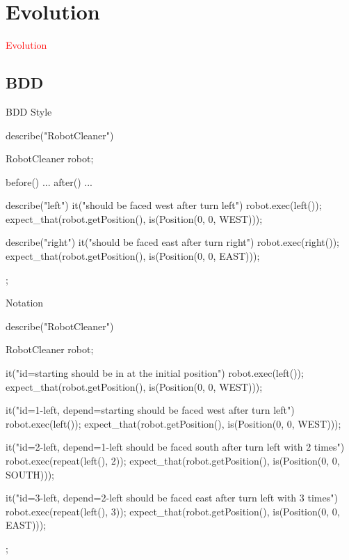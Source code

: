 \section{Evolution}
\label{sec:evolution}

\begin{frame}
  \begin{center}
    \Huge{\textcolor{red}{Evolution}}
  \end{center}
\end{frame}

\subsection{BDD}

\begin{frame}[fragile]{BDD Style}
\begin{c++}
describe("RobotCleaner")
{
    RobotCleaner robot;

    before() { ... }
    after()  { ... }

    describe("left")
    {
        it("should be faced west after turn left")
        {
            robot.exec(left());
            expect_that(robot.getPosition(), is(Position(0, 0, WEST)));
        }
    }

    describe("right")
    {
        it("should be faced east after turn right")
        {
            robot.exec(right());
            expect_that(robot.getPosition(), is(Position(0, 0, EAST)));
        }
    }
};
\end{c++}
\end{frame}

\begin{frame}[fragile]{Notation}
\begin{c++}
describe("RobotCleaner") 
{
    RobotCleaner robot;

    it("{id=starting} should be in at the initial position") 
    {
        robot.exec(left());
        expect_that(robot.getPosition(), is(Position(0, 0, WEST)));
    }

    it("{id=1-left, depend=starting} should be faced west after turn left") 
    {
        robot.exec(left());
        expect_that(robot.getPosition(), is(Position(0, 0, WEST)));
    }

    it("{id=2-left, depend=1-left} should be faced south after turn left with 2 times") 
    {
        robot.exec(repeat(left(), 2));
        expect_that(robot.getPosition(), is(Position(0, 0, SOUTH)));
    }

    it("{id=3-left, depend=2-left} should be faced east after turn left with 3 times") 
    {
        robot.exec(repeat(left(), 3));
        expect_that(robot.getPosition(), is(Position(0, 0, EAST)));
    }
};
\end{c++}
\end{frame}
